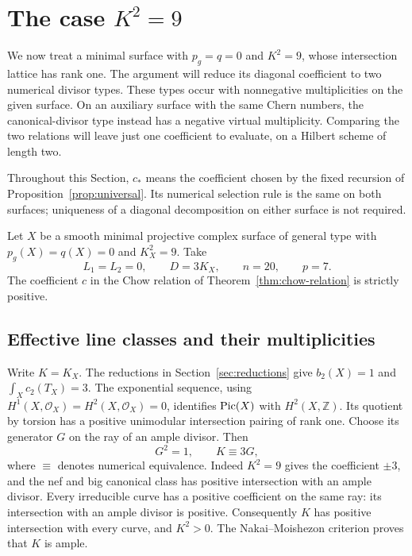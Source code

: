 \section{The case \texorpdfstring{\(K^2=9\)}{K squared equals 9}}
\label{sec:rankone}

We now treat a minimal surface with $p_g=q=0$ and $K^2=9$, whose
intersection lattice has rank one. The argument will reduce its diagonal
coefficient to two numerical divisor types. These types occur with
nonnegative multiplicities on the given surface. On an auxiliary surface
with the same Chern numbers, the canonical-divisor type instead has a
negative virtual multiplicity. Comparing the two relations will leave
just one coefficient to evaluate, on a Hilbert scheme of length two.

Throughout this Section, $c_*$ means the coefficient chosen by the fixed
recursion of Proposition~\ref{prop:universal}. Its numerical selection
rule is the same on both surfaces; uniqueness of a diagonal decomposition
on either surface is not required.

\begin{proposition}\label{prop:rankone}
Let $X$ be a smooth minimal projective complex surface of general type
with $p_g(X)=q(X)=0$ and $K_X^2=9$.  Take
\begin{equation}\label{r1:data}
 L_1=L_2=0,\qquad D=3K_X,\qquad n=20,\qquad p=7.
\end{equation}
The coefficient $c$ in the Chow relation of
Theorem~\ref{thm:chow-relation} is strictly positive.
\end{proposition}

\subsection{Effective line classes and their multiplicities}

Write $K=K_X$.  The reductions in Section~\ref{sec:reductions} give
$b_2(X)=1$ and $\int_X c_2(T_X)=3$.  The exponential sequence, using
$H^1(X,\mathcal O_X)=H^2(X,\mathcal O_X)=0$, identifies
$\operatorname{Pic}(X)$ with $H^2(X,\mathbb Z)$.  Its quotient by torsion has a
positive unimodular intersection pairing of rank one.  Choose its
generator $G$ on the ray of an ample divisor.  Then
\[
 G^2=1,\qquad K\equiv 3G,
\]
where $\equiv$ denotes numerical equivalence.  Indeed $K^2=9$ gives the
coefficient $\pm3$, and the nef and big canonical class has positive
intersection with an ample divisor.  Every irreducible curve has a
positive coefficient on the same ray: its intersection with an ample
divisor is positive.  Consequently $K$ has positive intersection with
every curve, and $K^2>0$.  The Nakai--Moishezon criterion proves that
$K$ is ample.

